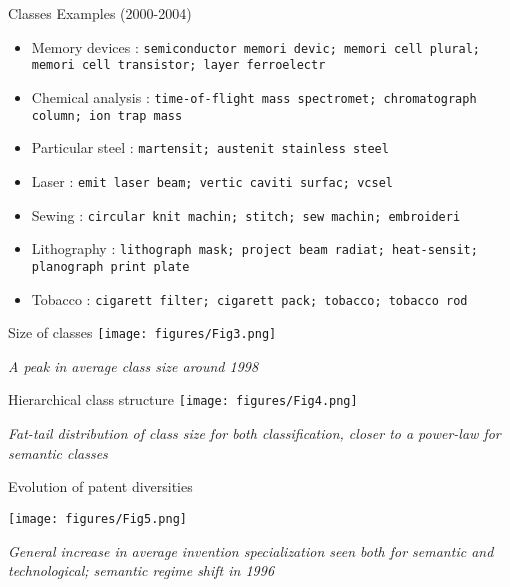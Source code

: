 \documentclass{beamer}
\begin{document}
\begin{frame}{Classes Examples (2000-2004)}



\begin{itemize}
\item Memory devices : \texttt{semiconductor memori devic; memori cell plural; memori cell transistor; layer ferroelectr}
\item Chemical analysis : \texttt{time-of-flight mass spectromet; chromatograph column; ion trap mass}
\item Particular steel : \texttt{martensit; austenit stainless steel}
\item Laser : \texttt{emit laser beam; vertic caviti surfac; vcsel}
\item Sewing : \texttt{circular knit machin; stitch; sew machin; embroideri}
\item Lithography : \texttt{lithograph mask; project beam radiat; heat-sensit; planograph print plate}
\item Tobacco : \texttt{cigarett filter; cigarett pack; tobacco; tobacco rod}
\end{itemize}
 \end{frame}



\begin{frame}{Size of classes}
   \centering
    \texttt{[image: figures/Fig3.png]}
    
    \medskip
    
    \textit{A peak in average class size around 1998}
    
\end{frame}

\begin{frame}{Hierarchical class structure}
   \centering
    \texttt{[image: figures/Fig4.png]}
    
    \medskip

    \textit{Fat-tail distribution of class size for both classification, closer to a power-law for semantic classes}
    
\end{frame}

\begin{frame}{Evolution of patent diversities}

\label{slide:diversity}
\hyperlink{slide:measures}{}

   \centering
    \texttt{[image: figures/Fig5.png]}
    
    \medskip

    \textit{General increase in average invention specialization seen both for semantic and technological; semantic regime shift in 1996} 
    
\end{frame}
\end{document}
